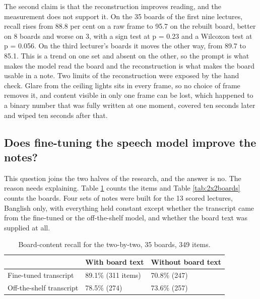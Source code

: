 The second claim is that the reconstruction improves reading, and the measurement does not
support it. On the 35 boards of the first nine lectures, recall rises from 88.8
per cent on a raw frame to 95.7 on the rebuilt board, better on 8 boards and worse on 3,
with a sign test at p = 0.23 and a Wilcoxon test at p = 0.056. On the third lecturer's
boards it moves the other way, from 89.7 to 85.1. This is a trend on one set and absent on
the other, so the prompt is what makes the model read the board and the reconstruction is
what makes the board usable in a note. Two limits of the reconstruction were exposed by
the hand check. Glare from the ceiling lights sits in every frame, so no choice of frame
removes it, and content visible in only one frame can be lost, which happened to a binary
number that was fully written at one moment, covered ten seconds later and wiped ten
seconds after that.

\subsection{Does fine-tuning the speech model improve the notes?}
\label{sec:2x2}

This question joins the two halves of the research, and the answer is no. The reason needs
explaining. Table \ref{tab:2x2items} counts the items and Table \ref{tab:2x2boards} counts the boards.
Four sets of notes were built for the 13 scored lectures,
Banglish only, with everything held constant except whether the transcript came from the
fine-tuned or the off-the-shelf model, and whether the board text was supplied at all.

\begin{table}[htbp]
\centering
\caption{Board-content recall for the two-by-two, 35 boards, 349 items.}
\label{tab:2x2items}
\small
\begin{tabular}{p{4.6cm}p{4.0cm}p{4.0cm}}
\toprule
& With board text & Without board text \\
\midrule
Fine-tuned transcript & 89.1\% (311 items) & 70.8\% (247) \\
Off-the-shelf transcript & 78.5\% (274) & 73.6\% (257) \\
\bottomrule
\end{tabular}
\end{table}

